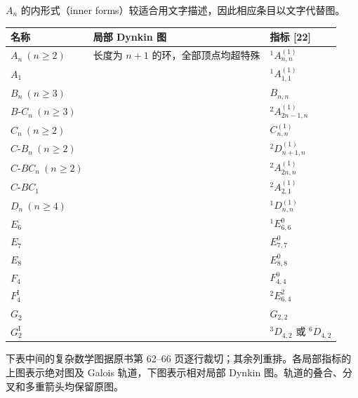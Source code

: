 $A_n$ 的内形式（inner forms）较适合用文字描述，因此相应条目以文字代替图。
\begin{longtable}{p{.20\linewidth}p{.52\linewidth}p{.19\linewidth}}
\toprule 名称 & 局部 Dynkin 图 & 指标 [22] \\\midrule\endhead
$A_n\ (n\geq2)$ & 长度为 $n+1$ 的环，全部顶点均超特殊 & ${}^1A_{n,n}^{(1)}$\\[8pt]
$A_1$ &  & ${}^1A_{1,1}^{(1)}$\\[10pt]
$B_n\ (n\geq3)$ &  & $B_{n,n}$\\[10pt]
$B\text{-}C_n\ (n\geq3)$ &  & ${}^2A_{2n-1,n}^{(1)}$\\[10pt]
$C_n\ (n\geq2)$ &  & $C_{n,n}^{(1)}$\\[10pt]
$C\text{-}B_n\ (n\geq2)$ &  & ${}^2D_{n+1,n}^{(1)}$\\[10pt]
$C\text{-}BC_n\ (n\geq2)$ &  & ${}^2A_{2n,n}^{(1)}$\\[10pt]
$C\text{-}BC_1$ &  & ${}^2A_{2,1}^{(1)}$\\[10pt]
$D_n\ (n\geq4)$ &  & ${}^1D_{n,n}^{(1)}$\\[10pt]
$E_6$ &  & ${}^1E_{6,6}^0$\\[10pt]
$E_7$ &  & $E_{7,7}^0$\\[10pt]
$E_8$ &  & $E_{8,8}^0$\\[10pt]
$F_4$ &  & $F_{4,4}^0$\\[10pt]
$F_4^{\mathrm I}$ &  & ${}^2E_{6,4}^2$\\[10pt]
$G_2$ &  & $G_{2,2}$\\[10pt]
$G_2^{\mathrm I}$ &  & ${}^3D_{4,2}\text{ 或 }{}^6D_{4,2}$\\[10pt]
\bottomrule
\end{longtable}
下表中间的复杂数学图据原书第 62--66 页逐行裁切；其余列重排。各局部指标的上图表示绝对图及 Galois 轨道，下图表示相对局部 Dynkin 图。轨道的叠合、分叉和多重箭头均保留原图。
